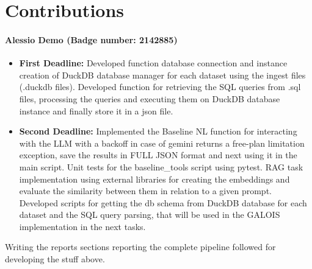 \section{Contributions}
\label{sec:contributions}
\paragraph{\textbf{Alessio Demo (Badge number: 2142885)}}
\begin{itemize}[leftmargin=*]
    \item \textbf{First Deadline:}  Developed function database connection and instance creation of DuckDB database manager for each dataset using the ingest files (.duckdb files).
    Developed function for retrieving the SQL queries from .sql files, processing the queries and executing them on DuckDB database instance and finally store it in a json file. 
    \item \textbf{Second Deadline:} Implemented the Baseline NL function for interacting with the LLM with a backoff in case of gemini returns a free-plan limitation exception, save the results in FULL JSON format and next using it in the main script. Unit tests for the baseline\_tools script using pytest. RAG task implementation using external libraries for creating the embeddings and evaluate the similarity between them in relation to a given prompt.
    Developed scripts for getting the db schema from DuckDB database for each dataset and the SQL query parsing, that will be used in the GALOIS implementation in the next tasks.
\end{itemize}
Writing the reports sections reporting the complete pipeline followed for developing the stuff above.

